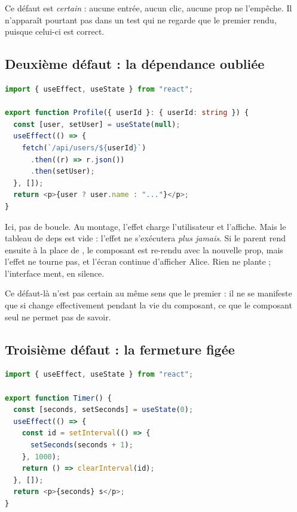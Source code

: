 Ce défaut est \emph{certain} : aucune entrée, aucun clic, aucune prop ne
l'empêche. Il n'apparaît pourtant pas dans un test qui ne regarde que le premier
rendu, puisque celui-ci est correct.

\subsection{Deuxième défaut : la dépendance oubliée}

\begin{lstlisting}[language=TypeScript,caption={\code{Profile} : l'effet lit \code{userId} mais ne le déclare pas (\file{/tmp/ch01/deps.tsx})},label={lst:introduction-deps}]
import { useEffect, useState } from "react";

export function Profile({ userId }: { userId: string }) {
  const [user, setUser] = useState(null);
  useEffect(() => {
    fetch(`/api/users/${userId}`)
      .then((r) => r.json())
      .then(setUser);
  }, []);
  return <p>{user ? user.name : "..."}</p>;
}
\end{lstlisting}

Ici, pas de boucle. Au montage, l'effet charge l'utilisateur  et
l'affiche. Mais le tableau de deps est vide : l'effet ne s'exécutera \emph{plus
jamais}. Si le parent rend ensuite  à la place
de , le composant est re-rendu avec la
nouvelle prop, mais l'effet ne tourne pas, et l'écran continue d'afficher
Alice. Rien ne plante ; l'interface ment, en silence.

Ce défaut-là n'est pas certain au même sens que le premier : il ne se manifeste
que si  change effectivement pendant la vie du composant, ce que le
composant seul ne permet pas de savoir.

\subsection{Troisième défaut : la fermeture figée}

\begin{lstlisting}[language=TypeScript,caption={\code{Timer} : le callback de \code{setInterval} lit une valeur figée au montage (\file{/tmp/ch01/timer.tsx})},label={lst:introduction-timer}]
import { useEffect, useState } from "react";

export function Timer() {
  const [seconds, setSeconds] = useState(0);
  useEffect(() => {
    const id = setInterval(() => {
      setSeconds(seconds + 1);
    }, 1000);
    return () => clearInterval(id);
  }, []);
  return <p>{seconds} s</p>;
}
\end{lstlisting}

